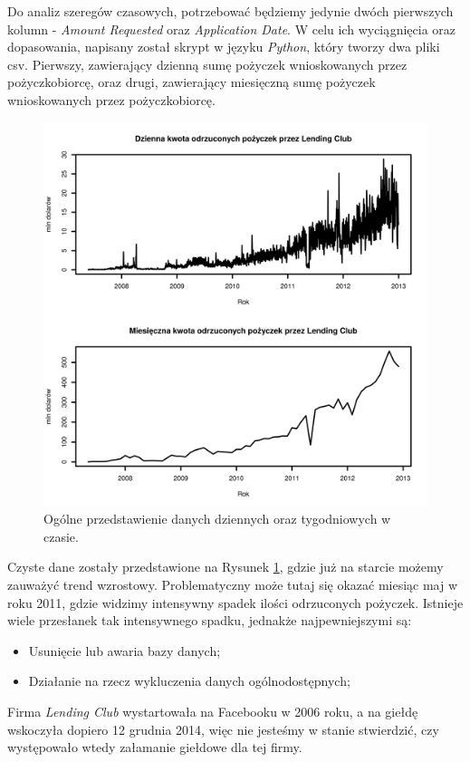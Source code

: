\documentclass[11pt]{article}
\begin{document}
Do analiz szeregów czasowych, potrzebować będziemy jedynie dwóch pierwszych kolumn - \textit{Amount Requested} oraz \textit{Application Date}. W celu ich wyciągnięcia oraz dopasowania, napisany został skrypt w języku \textit{Python}, który tworzy dwa pliki csv. Pierwszy, zawierający dzienną sumę pożyczek wnioskowanych przez pożyczkobiorcę, oraz drugi, zawierający miesięczną sumę pożyczek wnioskowanych przez pożyczkobiorcę.

\begin{figure}[h]

    \centering
	\includegraphics[width=\textwidth]{images/data_ogolnie_ts.png}
    \caption{Ogólne przedstawienie danych dziennych oraz tygodniowych w czasie.}
    \label{fig:data_ogolnie_ts}

\end{figure}

\newpage

Czyste dane zostały przedstawione na Rysunek \ref{fig:data_ogolnie_ts}, gdzie już na starcie możemy zauważyć trend wzrostowy. Problematyczny może tutaj się okazać miesiąc maj w roku 2011, gdzie widzimy intensywny spadek ilości odrzuconych pożyczek. Istnieje wiele przesłanek tak intensywnego spadku, jednakże najpewniejszymi są:
\begin{itemize}
\item Usunięcie lub awaria bazy danych;
\item Działanie na rzecz wykluczenia danych ogólnodostępnych;
\end{itemize}
Firma \textit{Lending Club} wystartowała na Facebooku w 2006 roku, a na giełdę wskoczyła dopiero 12 grudnia 2014, więc nie jesteśmy w stanie stwierdzić, czy występowało wtedy załamanie giełdowe dla tej firmy.
\end{document}
